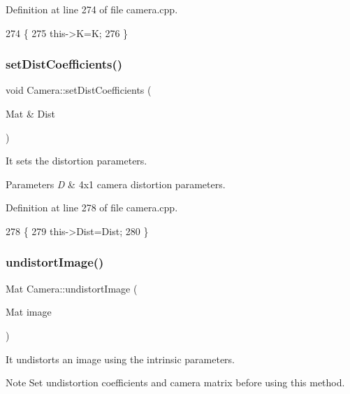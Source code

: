 Definition at line 274 of file camera.\+cpp.


\begin{DoxyCode}
274                                    \{
275     this->K=K;
276 \}
\end{DoxyCode}
\mbox{\label{classCamera_a018fb29ce30458045b22eeee47f61057}} 
\subsubsection{\texorpdfstring{set\+Dist\+Coefficients()}{setDistCoefficients()}}
{\footnotesize\ttfamily void Camera\+::set\+Dist\+Coefficients (\begin{DoxyParamCaption}\item[{Mat \&}]{Dist }\end{DoxyParamCaption})}



It sets the distortion parameters. 


\begin{DoxyParams}{Parameters}
{\em D} & 4x1 camera distortion parameters. \\
\hline
\end{DoxyParams}


Definition at line 278 of file camera.\+cpp.


\begin{DoxyCode}
278                                           \{
279     this->Dist=Dist;
280 \}
\end{DoxyCode}
\mbox{\label{classCamera_ae261c6f36e0b9c6aa40917b60ae7b1fa}} 
\subsubsection{\texorpdfstring{undistort\+Image()}{undistortImage()}}
{\footnotesize\ttfamily Mat Camera\+::undistort\+Image (\begin{DoxyParamCaption}\item[{Mat}]{image }\end{DoxyParamCaption})}



It undistorts an image using the intrinsic parameters. 

\begin{DoxyNote}{Note}
Set undistortion coefficients and camera matrix before using this method. 
\end{DoxyNote}

